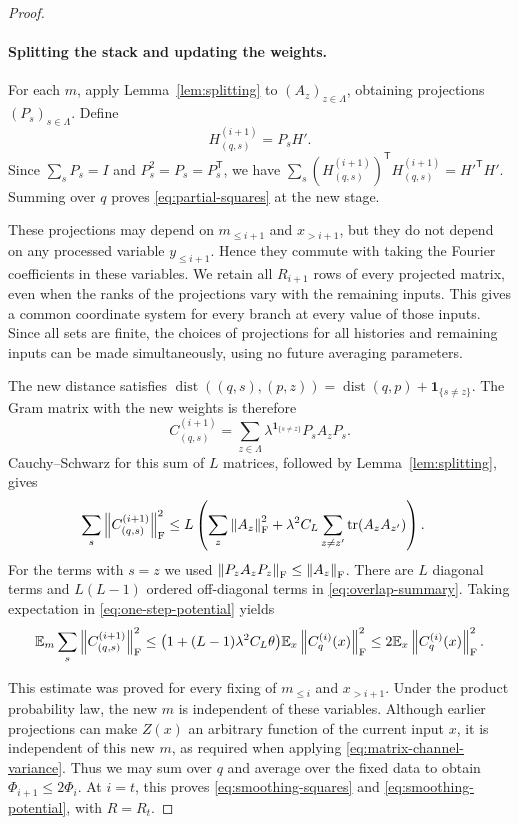 \begin{proof}
\paragraph{Splitting the stack and updating the weights.}
For each $m$, apply Lemma~\ref{lem:splitting} to $(A_z)_{z\in\Lambda}$,
obtaining projections $(P_s)_{s\in\Lambda}$.  Define
\[
  H_{(q,s)}^{(i+1)}=P_sH'.
\]
Since $\sum_sP_s=I$ and $P_s^2=P_s=P_s^{\mathsf T}$, we have
$\sum_s(H_{(q,s)}^{(i+1)})^{\mathsf T}H_{(q,s)}^{(i+1)}
=H'^{\mathsf T}H'$.
Summing over $q$ proves \eqref{eq:partial-squares} at the new stage.

These projections may depend on $m_{\le i+1}$ and $x_{>i+1}$, but
they do not depend on any processed variable $y_{\le i+1}$.
Hence they commute with taking the Fourier coefficients in these
variables.  We retain all $R_{i+1}$ rows of every projected matrix,
even when the ranks of the projections vary with the
remaining inputs.  This gives a common coordinate system for every
branch at every value of those inputs.  Since all sets are finite,
the choices of projections for all histories and remaining inputs can
be made simultaneously, using no future averaging parameters.

The new distance satisfies
$\operatorname{dist}((q,s),(p,z))
=\operatorname{dist}(q,p)+\mathbf1_{\{s\ne z\}}$.
The Gram matrix with the new weights is therefore
\[
  C_{(q,s)}^{(i+1)}
  =\sum_{z\in\Lambda}\lambda^{\mathbf1_{\{s\ne z\}}}P_sA_zP_s.
\]
Cauchy--Schwarz for this sum of $L$ matrices, followed by
Lemma~\ref{lem:splitting}, gives
\begin{equation}\label{eq:one-step-potential}
\begin{split}
  \sum_s\left\lVert C_{(q,s)}^{(i+1)}\right\rVert_{\mathrm F}^2
  &\le L\left(
       \sum_z\left\lVert A_z\right\rVert_{\mathrm F}^2
       +\lambda^2C_L\sum_{z\ne z'}\operatorname{tr}(A_zA_{z'})
       \right).
\end{split}
\end{equation}
For the terms with $s=z$ we used
$\left\lVert P_zA_zP_z\right\rVert_{\mathrm F}\le\left\lVert A_z\right\rVert_{\mathrm F}$.
There are $L$ diagonal terms and $L(L-1)$ ordered off-diagonal terms
in \eqref{eq:overlap-summary}.  Taking expectation in
\eqref{eq:one-step-potential} yields
\[
  \mathbb E_m\sum_s\left\lVert C_{(q,s)}^{(i+1)}\right\rVert_{\mathrm F}^2
  \le\bigl(1+(L-1)\lambda^2C_L\theta\bigr)
          \mathbb E_x\left\lVert C_q^{(i)}(x)\right\rVert_{\mathrm F}^2
  \le2\mathbb E_x\left\lVert C_q^{(i)}(x)\right\rVert_{\mathrm F}^2.
\]

This estimate was proved for every fixing of $m_{\le i}$ and
$x_{>i+1}$.  Under the product probability law, the new $m$ is
independent of these variables.  Although earlier projections can
make $Z(x)$ an arbitrary function of the current input $x$, it is
independent of this new $m$, as required when applying
\eqref{eq:matrix-channel-variance}.  Thus we may sum over $q$ and
average over the fixed data to obtain $\Phi_{i+1}\le2\Phi_i$.
At $i=t$, this proves \eqref{eq:smoothing-squares} and
\eqref{eq:smoothing-potential}, with $R=R_t$.


\end{proof}
